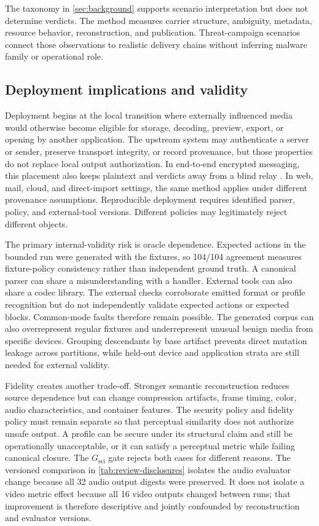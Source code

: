 The taxonomy in \cref{sec:background} supports scenario interpretation but does
not determine verdicts. The method measures carrier structure, ambiguity,
metadata, resource behavior, reconstruction, and publication. Threat-campaign
scenarios connect those observations to realistic delivery chains without
inferring malware family or operational role.

\subsection{Deployment implications and validity}

Deployment begins at the local transition where externally influenced media
would otherwise become eligible for storage, decoding, preview, export, or
opening by another application. The upstream system may authenticate a server
or sender, preserve transport integrity, or record provenance, but those
properties do not replace local output authorization. In end-to-end encrypted
messaging, this placement also keeps plaintext and verdicts away from a blind
relay \cite{unger2015,cohngordon2020,abelson2024}. In web, mail, cloud, and
direct-import settings, the same method applies under different provenance
assumptions. Reproducible deployment requires identified parser, policy, and
external-tool versions. Different policies may legitimately reject different
objects.

The primary internal-validity risk is oracle dependence. Expected actions in
the bounded run were generated with the fixtures, so 104/104 agreement measures
fixture-policy consistency rather than independent ground truth. A canonical
parser can share a misunderstanding with a handler. External tools can also
share a codec library. The external checks corroborate emitted format or profile
recognition but do not independently validate expected actions or expected
blocks. Common-mode faults therefore remain possible. The generated corpus can
also overrepresent regular fixtures and underrepresent unusual benign media from
specific devices. Grouping descendants by base artifact prevents direct
mutation leakage across partitions, while held-out device and application
strata are still needed for external validity.

Fidelity creates another trade-off. Stronger semantic reconstruction reduces
source dependence but can change compression artifacts, frame timing, color,
audio characteristics, and container features. The security policy and fidelity
policy must remain separate so that perceptual similarity does not authorize
unsafe output. A profile can be secure under its structural claim and still be
operationally unacceptable, or it can satisfy a perceptual metric while failing
canonical closure. The \(G_{\mathrm{sci}}\) gate rejects both cases for
different reasons. The versioned comparison in
\cref{tab:review-disclosures} isolates the audio evaluator change because all
32 audio output digests were preserved. It does not isolate a video metric
effect because all 16 video outputs changed between runs; that improvement is
therefore descriptive and jointly confounded by reconstruction and evaluator
versions.

